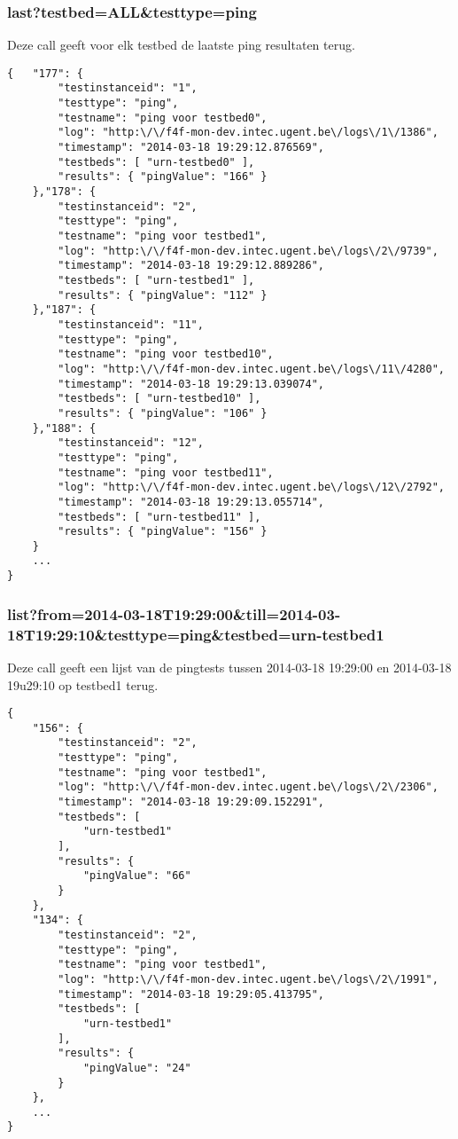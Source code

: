 \clearpage
\subsubsection{last?testbed=ALL\&testtype=ping}
Deze call geeft voor elk testbed de laatste ping resultaten terug.
\begin{verbatim}
{   "177": {
        "testinstanceid": "1",
        "testtype": "ping",
        "testname": "ping voor testbed0",
        "log": "http:\/\/f4f-mon-dev.intec.ugent.be\/logs\/1\/1386",
        "timestamp": "2014-03-18 19:29:12.876569",
        "testbeds": [ "urn-testbed0" ],
        "results": { "pingValue": "166" }
    },"178": {
        "testinstanceid": "2",
        "testtype": "ping",
        "testname": "ping voor testbed1",
        "log": "http:\/\/f4f-mon-dev.intec.ugent.be\/logs\/2\/9739",
        "timestamp": "2014-03-18 19:29:12.889286",
        "testbeds": [ "urn-testbed1" ],
        "results": { "pingValue": "112" }
    },"187": {
        "testinstanceid": "11",
        "testtype": "ping",
        "testname": "ping voor testbed10",
        "log": "http:\/\/f4f-mon-dev.intec.ugent.be\/logs\/11\/4280",
        "timestamp": "2014-03-18 19:29:13.039074",
        "testbeds": [ "urn-testbed10" ],
        "results": { "pingValue": "106" }
    },"188": {
        "testinstanceid": "12",
        "testtype": "ping",
        "testname": "ping voor testbed11",
        "log": "http:\/\/f4f-mon-dev.intec.ugent.be\/logs\/12\/2792",
        "timestamp": "2014-03-18 19:29:13.055714",
        "testbeds": [ "urn-testbed11" ],
        "results": { "pingValue": "156" }
    }
    ...
}
\end{verbatim}

\subsubsection{list?from=2014-03-18T19:29:00\&till=2014-03-18T19:29:10\&testtype=ping\&testbed=urn-testbed1}
Deze call geeft een lijst van de pingtests tussen 2014-03-18 19:29:00 en 2014-03-18 19u29:10 op testbed1 terug.
\begin{verbatim}
{
    "156": {
        "testinstanceid": "2",
        "testtype": "ping",
        "testname": "ping voor testbed1",
        "log": "http:\/\/f4f-mon-dev.intec.ugent.be\/logs\/2\/2306",
        "timestamp": "2014-03-18 19:29:09.152291",
        "testbeds": [
            "urn-testbed1"
        ],
        "results": {
            "pingValue": "66"
        }
    },
    "134": {
        "testinstanceid": "2",
        "testtype": "ping",
        "testname": "ping voor testbed1",
        "log": "http:\/\/f4f-mon-dev.intec.ugent.be\/logs\/2\/1991",
        "timestamp": "2014-03-18 19:29:05.413795",
        "testbeds": [
            "urn-testbed1"
        ],
        "results": {
            "pingValue": "24"
        }
    },
    ...
}
\end{verbatim}
\clearpage
